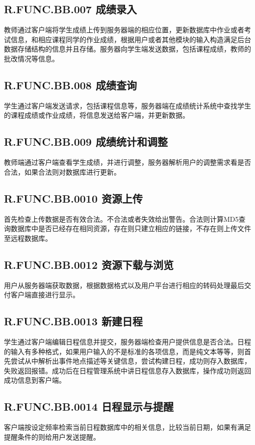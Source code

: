 \subsection{R.FUNC.BB.007   成绩录入}
教师通过客户端将学生成绩上传到服务器端的相应位置，更新数据库中作业或者考试信息，和相应课程同学的作业成绩，根据用户或者其他模块的输入构造满足后台数据存储结构的信息并且存储。服务器向学生端发送数据，包括课程成绩，教师的批改情况等信息。

\subsection{R.FUNC.BB.008   成绩查询}
学生通过客户端发送请求，包括课程信息等，服务器端在成绩统计系统中查找学生的课程成绩或作业成绩，将信息发送给客户端，并更新数据。

\subsection{R.FUNC.BB.009   成绩统计和调整}
教师端通过客户端查看学生成绩，并进行调整，服务器解析用户的调整需求看是否合法，如果合法则对数据库进行更新。

\subsection{R.FUNC.BB.0010   资源上传}
首先检查上传数据是否有效合法。不合法或者失效给出警告。合法则计算MD5查询数据库中是否已经存在相同资源，存在则只建立相应的链接，不存在则上传文件至远程数据库。

\subsection{R.FUNC.BB.0012   资源下载与浏览}
用户从服务器端获取数据，根据数据格式以及用户平台进行相应的转码处理最后交付客户端直接进行显示。

\subsection{R.FUNC.BB.0013   新建日程}
学生通过客户端编辑日程信息并提交，服务器端检查用户提供信息是否合法。日程的输入有多种格式，如果用户输入的不是标准的各项信息，而是纯文本等等，则首先尝试从中解析出事件地点描述等关键信息，尝试构建日程，成功则存入数据库，失败返回报错。成功后在日程管理系统中讲日程信息存入数据库，操作成功则返回成功信息到客户端。

\subsection{R.FUNC.BB.0014   日程显示与提醒}
客户端按设定频率检索当前日程数据库中的相关信息，比较当前日期，如果有满足提醒条件的则给用户发送提醒。

